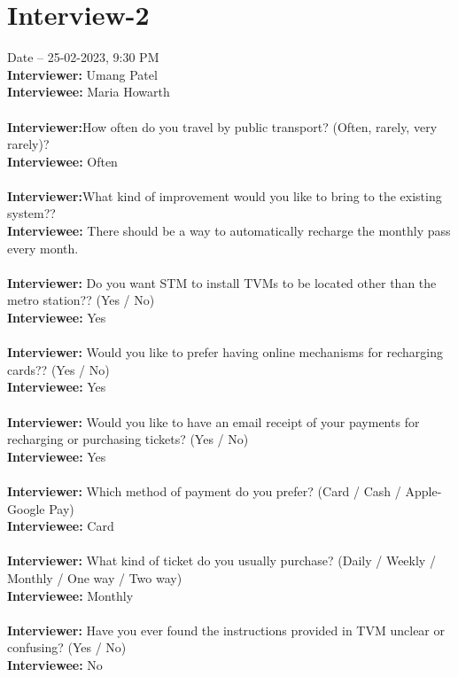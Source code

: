 \documentclass[a4paper,12pt]{report}
\begin{document}
\section{Interview-2}
Date – 25-02-2023, 9:30 PM\\
\textbf{Interviewer:} Umang Patel\\
\textbf{Interviewee:} Maria Howarth \\\\
\textbf{Interviewer:}How often do you travel by public transport? (Often, rarely, very rarely)?\\
\textbf{Interviewee:} Often\\\\
\textbf{Interviewer:}What kind of improvement would you like to bring to the existing system??\\
\textbf{Interviewee:} There should be a way to automatically recharge the monthly pass every month.\\\\
\textbf{Interviewer:}  Do you want STM to install TVMs to be located other than the metro station?? (Yes / No)\\
\textbf{Interviewee:} Yes\\\\
\textbf{Interviewer:}  Would you like to prefer having online mechanisms for recharging cards?? (Yes / No)\\
\textbf{Interviewee:} Yes\\\\
\textbf{Interviewer:} Would you like to have an email receipt of your payments for recharging or purchasing tickets? (Yes / No)\\
\textbf{Interviewee:} Yes\\\\
\textbf{Interviewer:}  Which method of payment do you prefer? (Card / Cash / Apple-Google Pay)\\
\textbf{Interviewee:} Card\\\\
\textbf{Interviewer:} What kind of ticket do you usually purchase? (Daily / Weekly /  Monthly / One way / Two way) \\
\textbf{Interviewee:} Monthly \\\\
\textbf{Interviewer:} Have you ever found the instructions provided
in TVM unclear or confusing? (Yes / No)\\
\textbf{Interviewee:} No\\\\
\end{document}
